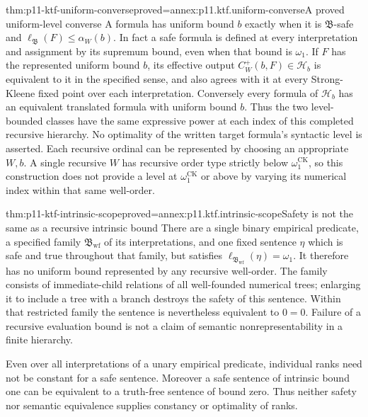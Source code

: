 \begin{hbtheorem}{thm:p11-ktf-uniform-converse}{proved=annex:p11.ktf.uniform-converse}{A proved uniform-level converse}
A formula has uniform bound \(b\) exactly when it is
\(\mathfrak B\)-safe and
\(\ell_{\mathfrak B}(F)\leq\alpha_W(b)\). In fact a safe
formula is defined at every interpretation and assignment by its
supremum bound, even when that bound is \(\omega_1\).
If \(F\) has the represented uniform bound \(b\), its effective output
\(C_W^+(b,F)\in\mathcal H_b\) is equivalent to it in
the specified sense, and also agrees with it at every
Strong-Kleene fixed point over each interpretation. Conversely
every formula of \(\mathcal H_b\) has an equivalent
translated formula with uniform bound \(b\).
Thus the two level-bounded classes have the same expressive power
at each index of this completed recursive hierarchy. No optimality
of the written target formula's syntactic level is asserted.
Each recursive ordinal can be represented by choosing an appropriate
\(W,b\). A single recursive \(W\) has recursive order type
strictly below \(\omega_1^{\mathrm{CK}}\), so this construction
does not provide a level at \(\omega_1^{\mathrm{CK}}\) or above
by varying its numerical index within that same well-order.
\end{hbtheorem}

\begin{hbtheorem}{thm:p11-ktf-intrinsic-scope}{proved=annex:p11.ktf.intrinsic-scope}{Safety is not the same as a recursive intrinsic bound}
There are a single binary empirical predicate, a specified family
\(\mathfrak B_{\mathrm{wf}}\) of its interpretations, and one
fixed sentence \(\eta\) which is safe and true throughout that
family, but satisfies
\(\ell_{\mathfrak B_{\mathrm{wf}}}(\eta)=\omega_1\).
It therefore has no uniform bound represented by any recursive
well-order. The family consists of immediate-child relations of all
well-founded numerical trees; enlarging it to include a tree with
a branch destroys the safety of this sentence.
Within that restricted family the sentence is nevertheless equivalent
to \(0=0\). Failure of a recursive evaluation bound is not a
claim of semantic nonrepresentability in a finite hierarchy.

Even over all interpretations of a unary empirical predicate,
individual ranks need not be constant for a safe sentence.
Moreover a safe sentence of intrinsic bound one can be equivalent
to a truth-free sentence of bound zero. Thus neither safety nor
semantic equivalence supplies constancy or optimality of ranks.
\end{hbtheorem}

